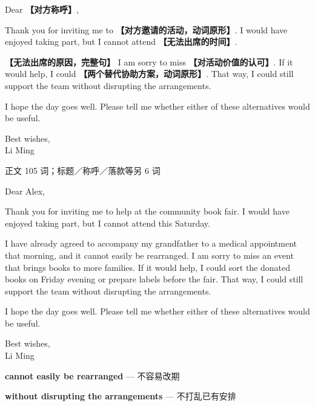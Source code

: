 \documentclass[11pt,a4paper,fontset=macnew]{ctexart}
\newenvironment{writing}{\begingroup\fontsize{10.5}{13.5}\selectfont\setlength{\parskip}{3pt}}{\par\endgroup}
\newenvironment{example}{\begingroup\fontsize{11}{14.3}\selectfont\setlength{\parskip}{4pt}}{\par\endgroup}
\begin{document}
\begin{writing}
\noindent Dear {\bfseries 【对方称呼】},\par
Thank you for inviting me to {\bfseries 【对方邀请的活动，动词原形】}. I would have enjoyed taking part, but I cannot attend {\bfseries 【无法出席的时间】}.

{\bfseries 【无法出席的原因，完整句】} I am sorry to miss {\bfseries 【对活动价值的认可】}. If it would help, I could {\bfseries 【两个替代协助方案，动词原形】}. That way, I could still support the team without disrupting the arrangements.

I hope the day goes well. Please tell me whether either of these alternatives would be useful.

\noindent Best wishes,\\Li Ming\par
\end{writing}
\par\vspace{4pt}{\bfseries 完整套用示例}\par\nopagebreak
{\small 正文 105 词；标题／称呼／落款等另 6 词}\par
\begin{example}
\noindent Dear Alex,\par
Thank you for inviting me to help at the community book fair. I would have enjoyed taking part, but I cannot attend this Saturday.

I have already agreed to accompany my grandfather to a medical appointment that morning, and it cannot easily be rearranged. I am sorry to miss an event that brings books to more families. If it would help, I could sort the donated books on Friday evening or prepare labels before the fair. That way, I could still support the team without disrupting the arrangements.

I hope the day goes well. Please tell me whether either of these alternatives would be useful.

\noindent Best wishes,\\Li Ming\par
\end{example}
\par\vspace{4pt}{\bfseries 好词好句：优先记这三处}\par\nopagebreak
{\small\textbf{cannot easily be rearranged} — 不容易改期}\par
{\small\textbf{without disrupting the arrangements} — 不打乱已有安排}\par
\end{document}
